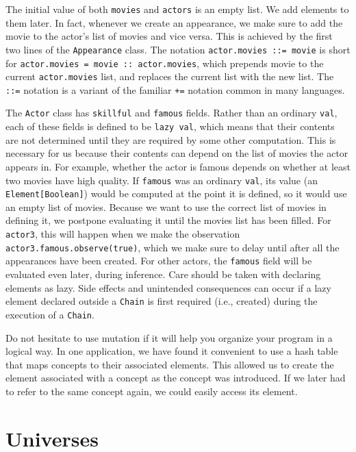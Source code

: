 The initial value of both \texttt{movies} and \texttt{actors} is an empty list. We add elements to them later. In fact, whenever we create an appearance, we make sure to add the movie to the actor's list of movies and vice versa. This is achieved by the first two lines of the \texttt{Appearance} class. The notation \texttt{actor.movies ::= movie} is short for \texttt{actor.movies = movie :: actor.movies}, which prepends movie to the current \texttt{actor.movies} list, and replaces the current list with the new list. The \texttt{::=} notation is a variant of the familiar \texttt{+=} notation common in many languages.

The \texttt{Actor} class has \texttt{skillful} and \texttt{famous} fields. Rather than an ordinary \texttt{val}, each of these fields is defined to be \texttt{lazy val}, which means that their contents are not determined until they are required by some other computation. This is necessary for us because their contents can depend on the list of movies the actor appears in. For example, whether the actor is famous depends on whether at least two movies have high quality. If \texttt{famous} was an ordinary \texttt{val}, its value (an \texttt{Element[Boolean]}) would be computed at the point it is defined, so it would use an empty list of movies. Because we want to use the correct list of movies in defining it, we postpone evaluating it until the movies list has been filled. For \texttt{actor3}, this will happen when we make the observation \texttt{actor3.famous.observe(true)}, which we make sure to delay until after all the appearances have been created. For other actors, the \texttt{famous} field will be evaluated even later, during inference. Care should be taken with declaring elements as lazy. Side effects and unintended consequences can occur if a lazy element declared outside a \texttt{Chain} is first required (i.e., created) during the execution of a \texttt{Chain}.

Do not hesitate to use mutation if it will help you organize your program in a logical way. In one application, we have found it convenient to use a hash table that maps concepts to their associated elements. This allowed us to create the element associated with a concept as the concept was introduced. If we later had to refer to the same concept again, we could easily access its element.

\section{Universes}

